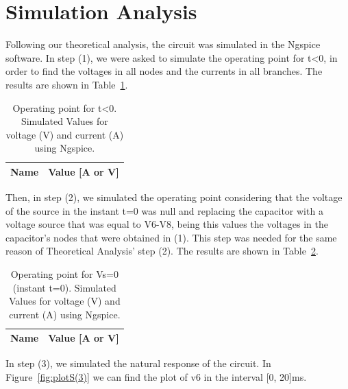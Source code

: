 \section{Simulation Analysis}
\label{sec:simulation}

Following our theoretical analysis, the circuit was simulated in the Ngspice software. 
In step (1), we were asked to simulate the operating point for t<0, in order to find the voltages in all nodes and the currents in all branches. The results are shown in Table~\ref{tab:alinea1}.

\begin{table}[h]
  \centering
  \begin{tabular}{|l|r|}
    \hline    
    {\bf Name} & {\bf Value [A or V]} \\ \hline
    
  \end{tabular}
  \caption{Operating point for t<0. Simulated Values for voltage (V) and current (A) using Ngspice.}
  \label{tab:alinea1}
\end{table}

Then, in step (2), we simulated the operating point considering that the voltage of the source in the instant t=0 was null and replacing the capacitor with a voltage source that was equal to V6-V8, being this values the voltages in the capacitor's nodes that were obtained in (1). This step was needed for the same reason of Theoretical Analysis' step (2). The results are shown in Table~\ref{tab:alinea2}.

\begin{table}[h]
  \centering
  \begin{tabular}{|l|r|}
    \hline    
    {\bf Name} & {\bf Value [A or V]} \\ \hline
    
  \end{tabular}
  \caption{Operating point for Vs=0 (instant t=0). Simulated Values for voltage (V) and current (A) using Ngspice.}
  \label{tab:alinea2}
\end{table}

In step (3), we simulated the natural response of the circuit. In Figure~\ref{fig:plotS(3)} we can find the plot of v6 in the interval [0, 20]ms.

\vspace{3.0cm}

